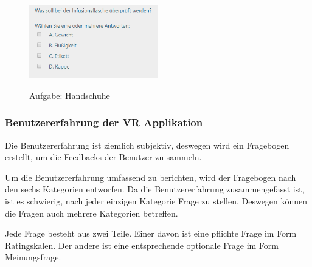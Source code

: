 \begin{enumerate}
\begin{figure}[ht]
\vspace*{1em}
\centering
\caption{Aufgabe: Handschuhe}
\includegraphics[width= 0.5\textwidth]{images/Aufgabe5.png}
\label{fig:Aufgabe5} 
\end{figure}
    
\end{enumerate}

\subsubsection{Benutzererfahrung der VR Applikation}

Die Benutzererfahrung ist ziemlich subjektiv, deswegen wird ein Fragebogen erstellt, um die Feedbacks der Benutzer zu sammeln.

Um die Benutzererfahrung umfassend zu berichten, wird der Fragebogen nach den sechs Kategorien \citep{28} entworfen. Da die Benutzererfahrung zusammengefasst ist, ist es schwierig, nach jeder einzigen Kategorie Frage zu stellen. Deswegen können die Fragen auch mehrere Kategorien betreffen.

Jede Frage besteht aus zwei Teile. Einer davon ist eine pflichte Frage im Form Ratingskalen. Der andere ist eine entsprechende optionale Frage im Form Meinungsfrage.

